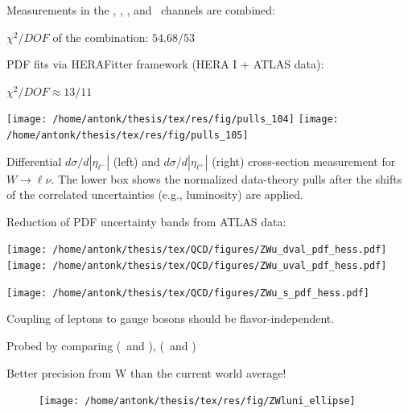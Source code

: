 {
\iteb
\item Measurements in the \Wmn, \Wen, \Zmm, and \Zee\ channels are combined:
\iteb
\item $\chi^{2}/DOF$ of the combination: $54.68/53$
\itee
\item PDF fits via HERAFitter framework (HERA I + ATLAS data):
\iteb
\item $\chi^{2}/DOF \approx 13/11$
\itee
\itee

    \texttt{[image: /home/antonk/thesis/tex/res/fig/pulls\_104]}
    \texttt{[image: /home/antonk/thesis/tex/res/fig/pulls\_105]}

\footnotesize{Differential $d\sigma/d|\eta_{\ell^{-}}|$ (left) and $d\sigma/d|\eta_{\ell^{+}}|$ (right) cross-section measurement for $W \rightarrow \ell\nu$. The lower box shows the normalized data-theory pulls after the shifts of the correlated uncertainties (e.g., luminosity) are applied.}


}

{

Reduction of PDF uncertainty bands from ATLAS data:

\colb[T]
\texttt{[image: /home/antonk/thesis/tex/QCD/figures/ZWu\_dval\_pdf\_hess.pdf]}\\
\texttt{[image: /home/antonk/thesis/tex/QCD/figures/ZWu\_uval\_pdf\_hess.pdf]}

\centering

\texttt{[image: /home/antonk/thesis/tex/QCD/figures/ZWu\_s\_pdf\_hess.pdf]}
\cole
}

{

\iteb
\item Coupling of leptons to gauge bosons should be flavor-independent.
\item Probed by comparing (\Wmn\ and \Wen), (\Zmm\ and \Zee)
\item Better precision from W than the current world average!
\itee

\begin{figure}
  \begin{center}
    \texttt{[image: /home/antonk/thesis/tex/res/fig/ZWluni\_ellipse]}
  \end{center}
\end{figure}

}

